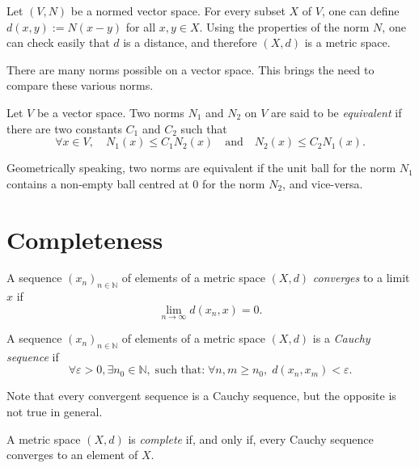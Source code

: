 \documentclass[a4paper,11pt,openany,extrafontsizes]{memoir}
\begin{document}
Let $(V,N)$ be a normed vector space. For every subset $X$ of $V$, one
can define $d(x,y) := N(x-y)$ for all $x,y\in X$. Using the properties
of the norm $N$, one can check easily that $d$ is a distance, and
therefore $(X,d)$ is a metric space.


There are many norms possible on a vector space. This brings the need
to compare these various norms.

\begin{defn}
  Let $V$ be a vector space. Two norms $N_1$ and $N_2$ on $V$ are said
  to be \emph{equivalent} if there are two constants $C_1$ and $C_2$
  such that
  \[ \forall x\in V,\quad N_1(x) \leq C_1 N_2(x) \quad\text{and}\quad N_2(x)
    \leq C_2 N_1(x). \]
\end{defn}

Geometrically speaking, two norms are equivalent if the unit ball for
the norm $N_1$ contains a non-empty ball centred at 0 for the norm
$N_2$, and vice-versa.


\section{Completeness}%
\label{sec:completeness}

\begin{defn}[Convergence]
  A sequence ${(x_n)}_{n\in\mathbb{N}}$ of elements of a metric space
  $(X,d)$ \emph{converges} to a limit $x$ if
  \[ \lim_{n\rightarrow\infty} d(x_n,x) = 0. \]
\end{defn}

\begin{defn}
  A sequence ${(x_n)}_{n\in\mathbb{N}}$ of elements of a metric space
  $(X,d)$ is a \emph{Cauchy sequence} if
  \[ \forall\varepsilon>0, \exists n_0\in\mathbb{N},\; \text{such
      that:}\; \forall n,m\geq n_0,\; d(x_n, x_m) < \varepsilon. \]
\end{defn}

Note that every convergent sequence is a Cauchy sequence, but the
opposite is not true in general. %

\begin{defn}[Completeness]
  A metric space $(X,d)$ is \emph{complete} if, and only if, every
  Cauchy sequence converges to an element of $X$.
\end{defn}
\end{document}
